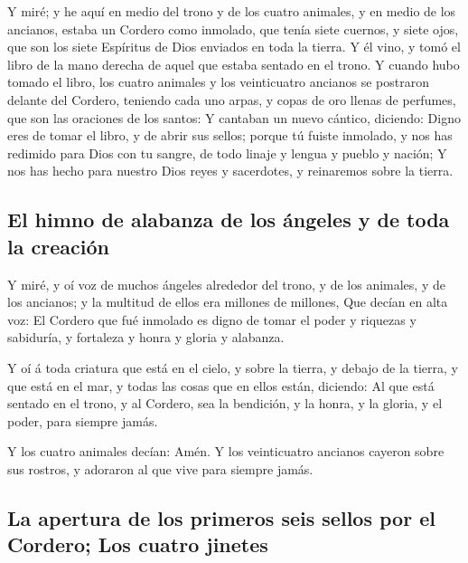  Y miré; y he aquí en medio del trono y de los cuatro
animales, y en medio de los ancianos, estaba un Cordero como inmolado,
que tenía siete cuernos, y siete ojos, que son los siete Espíritus de
Dios enviados en toda la tierra.  Y él vino, y tomó el
libro de la mano derecha de aquel que estaba sentado en el trono.
 Y cuando hubo tomado el libro, los cuatro animales y los
veinticuatro ancianos se postraron delante del Cordero, teniendo cada
uno arpas, y copas de oro llenas de perfumes, que son las oraciones de
los santos:  Y cantaban un nuevo cántico, diciendo: Digno
eres de tomar el libro, y de abrir sus sellos; porque tú fuiste
inmolado, y nos has redimido para Dios con tu sangre, de todo linaje y
lengua y pueblo y nación;  Y nos has hecho para nuestro
Dios reyes y sacerdotes, y reinaremos sobre la tierra.

\hypertarget{el-himno-de-alabanza-de-los-uxe1ngeles-y-de-toda-la-creaciuxf3n}{%
\subsection{El himno de alabanza de los ángeles y de toda la
creación}\label{el-himno-de-alabanza-de-los-uxe1ngeles-y-de-toda-la-creaciuxf3n}}

 Y miré, y oí voz de muchos ángeles alrededor del trono,
y de los animales, y de los ancianos; y la multitud de ellos era
millones de millones,  Que decían en alta voz: El Cordero
que fué inmolado es digno de tomar el poder y riquezas y sabiduría, y
fortaleza y honra y gloria y alabanza.

 Y oí á toda criatura que está en el cielo, y sobre la
tierra, y debajo de la tierra, y que está en el mar, y todas las cosas
que en ellos están, diciendo: Al que está sentado en el trono, y al
Cordero, sea la bendición, y la honra, y la gloria, y el poder, para
siempre jamás.

 Y los cuatro animales decían: Amén. Y los veinticuatro
ancianos cayeron sobre sus rostros, y adoraron al que vive para siempre
jamás.

\hypertarget{la-apertura-de-los-primeros-seis-sellos-por-el-cordero-los-cuatro-jinetes}{%
\subsection{La apertura de los primeros seis sellos por el Cordero; Los
cuatro
jinetes}\label{la-apertura-de-los-primeros-seis-sellos-por-el-cordero-los-cuatro-jinetes}}

